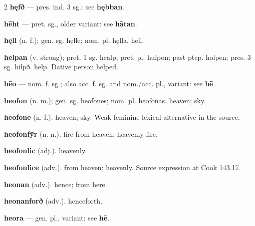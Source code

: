 \begin{multicols*}{2}
\textbf{hęfð} — pres. ind. 3 sg.: see \textbf{hębban}.\par
\textbf{hēht} — pret. sg., older variant: see \textbf{hātan}.\par
\textbf{hęll} (n. f.); gen. sg. hęlle; nom. pl. hęlla. hell.\par
\textbf{helpan} (v. strong); pret. 1 sg. healp; pret. pl. hulpon; past ptcp. holpen; pres. 3 sg. hilpð. help. Dative person helped.\par
\textbf{hēo} — nom. f. sg.; also acc. f. sg. and nom./acc. pl., variant: see \textbf{hē}.\par
\textbf{heofon} (n. m.); gen. sg. heofones; nom. pl. heofonas. heaven; sky.\par
\textbf{heofone} (n. f.). heaven; sky. Weak feminine lexical alternative in the source.\par
\textbf{heofonfȳr} (n. n.). fire from heaven; heavenly fire.\par
\textbf{heofonlic} (adj.). heavenly.\par
\textbf{heofonlice} (adv.). from heaven; heavenly. Source expression at Cook 143.17.\par
\textbf{heonan} (adv.). hence; from here.\par
\textbf{heonanforð} (adv.). henceforth.\par
\textbf{heora} — gen. pl., variant: see \textbf{hē}.\par

\end{multicols*}
